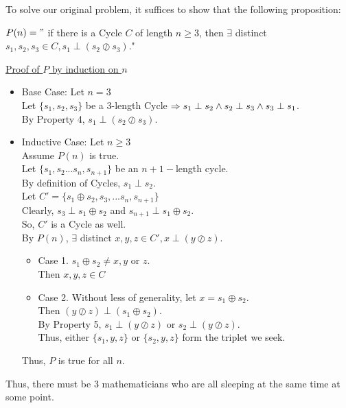 \documentclass[fleqn]{article}
\newcommand{\set}[1]{\lbrace #1 \rbrace}
\newcommand{\iunion}{\oplus}
\newcommand{\iinter}{\oslash}
\newcommand{\ioverlap}{\perp}
\begin{document}
To solve our original problem, it suffices to show that the following proposition:

$P(n)="$ if there is a Cycle $C$ of length $n \geq 3$, then $\exists$ distinct $s_1, s_2, s_3 \in C, s_1 \ioverlap (s_2 \iinter s_3)$."

\underline{Proof of $P$ by induction on $n$}
\begin{itemize}
  \item Base Case: Let $n = 3$\\
        Let $\set{s_1,s_2,s_3}$ be a 3-length Cycle $\Rightarrow\\
        s_1 \ioverlap s_2 \wedge s_2 \ioverlap s_3 \wedge s_3 \ioverlap s_1$.\\
        By Property 4, $s_1 \ioverlap (s_2 \iinter s_3)$.
  \item Inductive Case: Let $n \geq 3$\\
        Assume $P(n)$ is true.\\
        Let $\set{s_1,s_2...s_n,s_{n+1}}$ be an $n+1-$length cycle.\\
        By definition of Cycles, $s_1 \ioverlap s_2$.\\
        Let $C' = \set{s_1 \iunion s_2, s_3,...s_n, s_{n+1}}$\\
        Clearly, $s_3 \ioverlap s_1 \iunion s_2$ and 
                 $s_{n+1} \ioverlap s_1 \iunion s_2$.\\
        So, $C'$ is a Cycle as well.\\
        By $P(n)$, $\exists$ distinct $x,y,z \in C', x \ioverlap (y \iinter z)$.

        \begin{itemize}
          \item Case 1. $s_1 \iunion s_2 \not= x,y $ or $z$. \\
                Then $x,y,z \in C$
          \item Case 2. Without less of generality, let 
                $x = s_1 \iunion s_2$.\\
                Then $(y \iinter z) \ioverlap (s_1 \iunion s_2)$.\\
                By Property 5, $s_1 \ioverlap (y \iinter z)$ or
                               $s_2 \ioverlap (y \iinter z)$.\\
                Thus, either $\set{s_1,y,z}$ or $\set{s_2,y,z}$ form
                the triplet we seek.
        \end{itemize}
        
        Thus, $P$ is true for all $n$.
        
\end{itemize} 
       
Thus, there must be 3 mathematicians who are all sleeping at the same time at some point.
\end{document}
